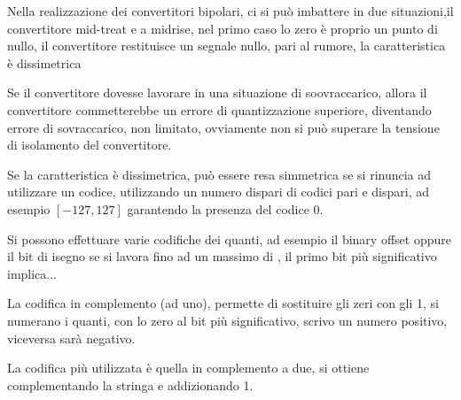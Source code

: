 Nella realizzazione dei convertitori bipolari, ci si può imbattere in due situazioni,il convertitore
mid-treat e a midrise, nel primo caso lo zero è proprio un punto di nullo, il convertitore restituisce un segnale nullo,
pari al rumore, la caratteristica è dissimetrica

Se il convertitore dovesse lavorare in una situazione di soovraccarico, allora il convertitore commetterebbe
un errore di quantizzazione superiore, diventando errore di sovraccarico, non limitato, ovviamente non si può superare
la tensione di isolamento del convertitore.

Se la caratteristica è dissimetrica, può essere resa simmetrica se si rinuncia ad utilizzare un codice,
utilizzando un numero dispari di codici pari e dispari, ad esempio $[-127,127]$ garantendo la 
presenza del codice 0.

Si possono effettuare varie codifiche dei quanti, ad esempio il binary offset oppure il bit di isegno se si lavora 
fino ad un massimo di , il primo bit più significativo implica... 

La codifica in complemento (ad uno), permette di sostituire gli zeri con gli 1, si numerano i quanti, con lo 
zero al bit più significativo, scrivo un numero positivo, viceversa sarà negativo.

La codifica più utilizzata è quella in complemento a due, si ottiene complementando la stringa e addizionando 
1.

